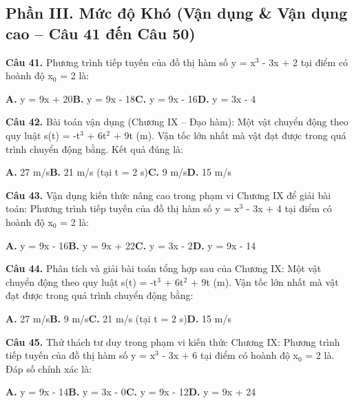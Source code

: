 \documentclass[11pt,a4paper]{article}
\begin{document}
\subsection*{\color{accent} Phần III. Mức độ Khó (Vận dụng \& Vận dụng cao -- Câu 41 đến Câu 50)}
\textbf{\color{primary} Câu 41.} Phương trình tiếp tuyến của đồ thị hàm số y = x$^3$ - 3x + 2 tại điểm có hoành độ x$_0$ = 2 là:\par
\hspace*{1.5em}\textbf{A.} y = 9x + 20\quad\quad \textbf{B.} y = 9x - 18\quad\quad \textbf{C.} y = 9x - 16\quad\quad \textbf{D.} y = 3x - 4\par\vspace{2pt}
\textbf{\color{primary} Câu 42.} Bài toán vận dụng (Chương IX – Đạo hàm): Một vật chuyển động theo quy luật s(t) = -t$^3$ + 6t$^2$ + 9t (m). Vận tốc lớn nhất mà vật đạt được trong quá trình chuyển động bằng. Kết quả đúng là:\par
\hspace*{1.5em}\textbf{A.} 27 m/s\quad\quad \textbf{B.} 21 m/s (tại t = 2 s)\quad\quad \textbf{C.} 9 m/s\quad\quad \textbf{D.} 15 m/s\par\vspace{2pt}
\textbf{\color{primary} Câu 43.} Vận dụng kiến thức nâng cao trong phạm vi Chương IX để giải bài toán: Phương trình tiếp tuyến của đồ thị hàm số y = x$^3$ - 3x + 4 tại điểm có hoành độ x$_0$ = 2 là:\par
\hspace*{1.5em}\textbf{A.} y = 9x - 16\quad\quad \textbf{B.} y = 9x + 22\quad\quad \textbf{C.} y = 3x - 2\quad\quad \textbf{D.} y = 9x - 14\par\vspace{2pt}
\textbf{\color{primary} Câu 44.} Phân tích và giải bài toán tổng hợp sau của Chương IX: Một vật chuyển động theo quy luật s(t) = -t$^3$ + 6t$^2$ + 9t (m). Vận tốc lớn nhất mà vật đạt được trong quá trình chuyển động bằng:\par
\hspace*{1.5em}\textbf{A.} 27 m/s\quad\quad \textbf{B.} 9 m/s\quad\quad \textbf{C.} 21 m/s (tại t = 2 s)\quad\quad \textbf{D.} 15 m/s\par\vspace{2pt}
\textbf{\color{primary} Câu 45.} Thử thách tư duy trong phạm vi kiến thức Chương IX: Phương trình tiếp tuyến của đồ thị hàm số y = x$^3$ - 3x + 6 tại điểm có hoành độ x$_0$ = 2 là. Đáp số chính xác là:\par
\hspace*{1.5em}\textbf{A.} y = 9x - 14\quad\quad \textbf{B.} y = 3x - 0\quad\quad \textbf{C.} y = 9x - 12\quad\quad \textbf{D.} y = 9x + 24\par\vspace{2pt}
\end{document}
